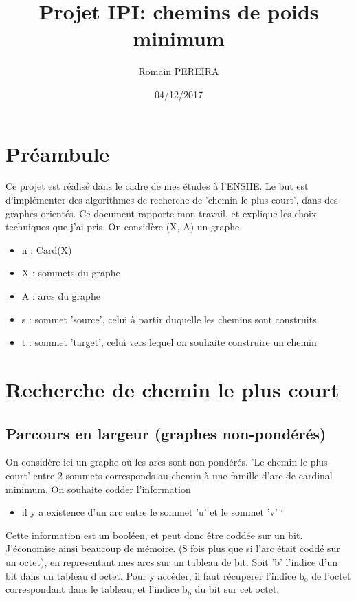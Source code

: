 \documentclass[a4paper,10pt]{article}
\title{Projet IPI: chemins de poids minimum}
\author{Romain PEREIRA}
\date{04/12/2017}
\begin{document}
  \maketitle
  \tableofcontents

  \section*{Préambule}
    Ce projet est réalisé dans le cadre de mes études à l'ENSIIE.\newline
    Le but est d'implémenter des algorithmes de recherche de 'chemin le plus court', dans des graphes orientés.\newline
    Ce document rapporte mon travail, et explique les choix techniques que j'ai pris.\newline\newline
    On considère (X, A) un graphe.
    \begin{itemize}[label=-]
      \item n : Card(X)
      \item X : sommets du graphe
      \item A : arcs du graphe
      \item s : sommet 'source', celui à partir duquelle les chemins sont construits
      \item t : sommet 'target', celui vers lequel on souhaite construire un chemin
    \end{itemize}
    
  \newpage
  \section{Recherche de chemin le plus court}
  \subsection{Parcours en largeur (graphes non-pondérés)}
    On considère ici un graphe où les arcs sont non pondérés.\newline
    'Le chemin le plus court' entre 2 sommets corresponds au chemin à une famille d'arc de cardinal minimum.\newline
    On souhaite codder l'information
    \begin{itemize}[label=-]
      \item il y a existence d'un arc entre le sommet 'u' et le sommet 'v' `
    \end{itemize}
    Cette information est un booléen, et peut donc être coddée sur un bit.
    J'économise ainsi beaucoup de mémoire. (8 fois plus que si l'arc était coddé sur un octet),
    en representant mes arcs sur un tableau de bit.\newline\newline
    Soit 'b' l'indice d'un bit dans un tableau d'octet.
    Pour y accéder, il faut récuperer l'indice $\textrm{b}_\textrm{o}$ de l'octet correspondant dans le tableau,
    et l'indice $\textrm{b}_\textrm{b}$ du bit sur cet octet.\newline
    
\end{document}
